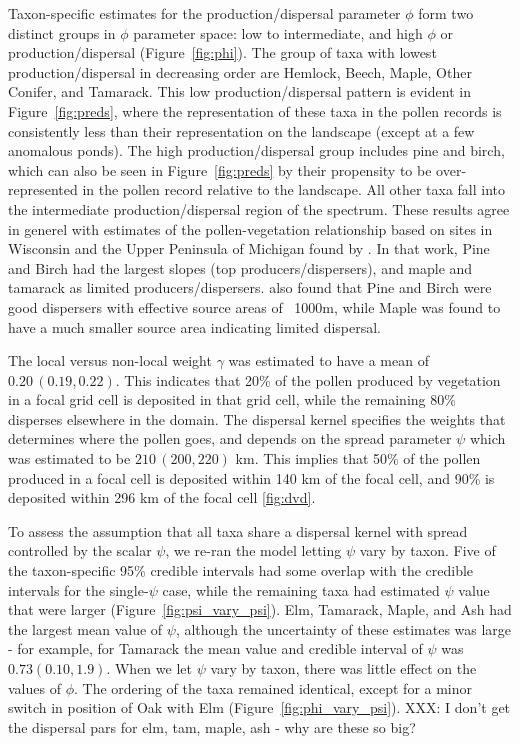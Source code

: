 \documentclass[12pt]{article}
\begin{document}
Taxon-specific estimates for the production/dispersal parameter $\phi$
form two distinct groups in $\phi$ parameter space: low to
intermediate, and high $\phi$ or production/dispersal
(Figure~\ref{fig:phi}). The group of taxa with lowest
production/dispersal in decreasing order are Hemlock, Beech, Maple,
Other Conifer, and Tamarack. This low production/dispersal pattern is
evident in Figure~\ref{fig:preds}, where the representation of these
taxa in the pollen records is consistently less than their
representation on the landscape (except at a few anomalous ponds). The
high production/dispersal group includes pine and birch, which can
also be seen in Figure~\ref{fig:preds} by their propensity to be
over-represented in the pollen record relative to the landscape. All
other taxa fall into the intermediate production/dispersal region of
the spectrum. These results agree in generel with estimates of the
pollen-vegetation relationship based on sites in Wisconsin and the
Upper Peninsula of Michigan found by \cite{prentice1986}. In that
work, Pine and Birch had the largest slopes (top
producers/dispersers), and maple and tamarack as limited
producers/dispersers. \cite{jackson1990} also found that Pine and
Birch were good dispersers with effective source areas of ~1000m,
while Maple was found to have a much smaller source area indicating
limited dispersal.

The local versus non-local weight $\gamma$ was estimated to have a
mean of $0.20\,(0.19, 0.22)$. This indicates that 20\% of the pollen
produced by vegetation in a focal grid cell is deposited in that grid
cell, while the remaining 80\% disperses elsewhere in the domain. The
dispersal kernel specifies the weights that determines where the
pollen goes, and depends on the spread parameter $\psi$ which was
estimated to be $210\,(200, 220)$ km. This implies that 50\% of the
pollen produced in a focal cell is deposited within 140 km of the
focal cell, and 90\% is deposited within 296 km of the focal cell \ref{fig:dvd}.

To assess the assumption that all taxa share a dispersal kernel with
spread controlled by the scalar $\psi$, we re-ran the model letting
$\psi$ vary by taxon. Five of the taxon-specific 95\% credible intervals had
some overlap with the credible intervals for the single-$\psi$ case,
while the remaining taxa had estimated $\psi$ value that were larger (Figure~\ref{fig:psi_vary_psi}). Elm, Tamarack, Maple, and Ash had the largest mean value of $\psi$, although the uncertainty of these estimates was large - for example, for Tamarack the mean value and credible interval of $\psi$ was $0.73 (0.10, 1.9)$. When we let $\psi$ vary by taxon, there was little effect on the values of $\phi$. The ordering of the taxa remained identical, except for a minor switch in position of Oak with Elm (Figure~\ref{fig:phi_vary_psi}). XXX: I don't get the dispersal pars for elm, tam, maple, ash - why are these so big?
\end{document}
